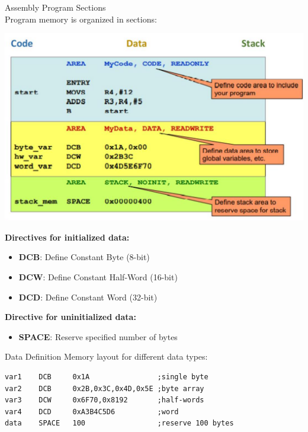 \begin{concept}{Assembly Program Sections}\\
Program memory is organized in sections:

\includegraphics[width=\linewidth]{images/2024_12_29_79e6b22f503fb7b4f718g-02(1)}

\textbf{Directives for initialized data:}
\begin{itemize}
  \item \textbf{DCB}: Define Constant Byte (8-bit)
  \item \textbf{DCW}: Define Constant Half-Word (16-bit)
  \item \textbf{DCD}: Define Constant Word (32-bit)
\end{itemize}

\textbf{Directive for uninitialized data:}
\begin{itemize}
  \item \textbf{SPACE}: Reserve specified number of bytes
\end{itemize}
\end{concept}

\begin{code}{Data Definition}
Memory layout for different data types:
\begin{lstlisting}[language=armasm, style=basesmol]
var1    DCB     0x1A                ;single byte
var2    DCB     0x2B,0x3C,0x4D,0x5E ;byte array
var3    DCW     0x6F70,0x8192       ;half-words
var4    DCD     0xA3B4C5D6          ;word
data    SPACE   100                 ;reserve 100 bytes
\end{lstlisting}
\end{code}

